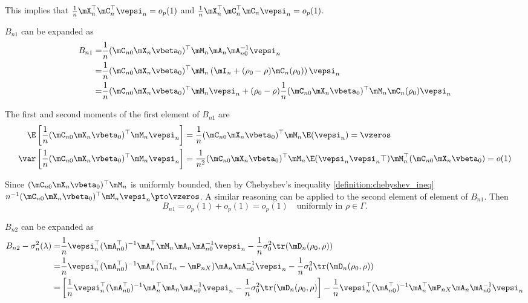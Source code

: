 \documentclass[english,12pt]{book}\usepackage[]{graphicx}\usepackage[]{xcolor}
\begin{document}
\begin{subappendices}
This implies that $\frac{1}{n}\mX_n^\top\mC_n^\top\vepsi_n  =o_p(1)$ and $\frac{1}{n}\mX_n^\top\mC_n^\top\mC_n\vepsi_n = o_p(1)$.

$B_{n1}$ can be expanded as
\begin{equation*}
\begin{aligned}
B_{n1}  = &  \frac{1}{n}(\mC_{n0}\mX_n\vbeta_0)^\top\mM_n\mA_n\mA_{n0}^{-1}\vepsi_n \\
        = & \frac{1}{n}(\mC_{n0}\mX_n\vbeta_0)^\top\mM_n\left(\mI_n + (\rho_0 - \rho)\mC_n (\rho_0)\right)\vepsi_n \\
        = & \frac{1}{n}(\mC_{n0}\mX_n\vbeta_0)^\top\mM_n\vepsi_n + (\rho_0 - \rho)\frac{1}{n}(\mC_{n0}\mX_n\vbeta_0)^\top\mM_n\mC_n(\rho_0)\vepsi_n 
\end{aligned} 
\end{equation*}

The first and second moments of the first element of $B_{n1}$ are
\begin{equation*}
\begin{aligned}
\E\left[\frac{1}{n}(\mC_{n0}\mX_n\vbeta_0)^\top\mM_n\vepsi_n\right] & = \frac{1}{n}(\mC_{n0}\mX_n\vbeta_0)^\top\mM_n\E(\vepsi_n) = \vzeros \\
\var\left[\frac{1}{n}(\mC_{n0}\mX_n\vbeta_0)^\top\mM_n\vepsi_n\right] & = \frac{1}{n^2}(\mC_{n0}\mX_n\vbeta_0)^\top\mM_n\E(\vepsi_n\vepsi_n\top)\mM_n^\top(\mC_{n0}\mX_n\vbeta_0) = o(1)
\end{aligned}
\end{equation*}

Since $(\mC_{n0}\mX_n\vbeta_0)^\top\mM_n$ is uniformly bounded, then by Chebyshev's inequality \ref{definition:chebyshev_ineq} $n^{-1}(\mC_{n0}\mX_n\vbeta_0)^\top\mM_n\vepsi_n\pto \vzeros$. A similar reasoning can be applied to the second element of element of $B_{n1}$. Then
\begin{equation*}
  B_{n1} =  o_p(1) + o_p(1) = o_p(1)\quad \mbox{uniformly in $\rho \in \Gamma$.}
\end{equation*}

$B_{n2}$ can be expanded as
\begin{equation*}
\begin{aligned}
B_{n2} - \sigma^2_n(\lambda) = & \frac{1}{n}\vepsi_n^\top(\mA_{n0}^\top)^{-1}\mA_n^\top\mM_n\mA_n\mA_{n0}^{-1}\vepsi_n -  \frac{1}{n}\sigma_0^2\tr(\mD_n(\rho_0, \rho))\\
= & \frac{1}{n}\vepsi_n^\top(\mA_{n0}^\top)^{-1}\mA_n^\top(\mI_n - \mP_{nX})\mA_n\mA_{n0}^{-1}\vepsi_n -  \frac{1}{n}\sigma_0^2\tr(\mD_n(\rho_0, \rho)) \\
= & \left[\frac{1}{n}\vepsi_n^\top(\mA_{n0}^\top)^{-1}\mA_n^\top\mA_n\mA_{n0}^{-1}\vepsi_n -   \frac{1}{n}\sigma_0^2\tr(\mD_n(\rho_0, \rho)\right] - \frac{1}{n}\vepsi_n^\top(\mA_{n0}^\top)^{-1}\mA_n^\top\mP_{nX}\mA_n\mA_{n0}^{-1}\vepsi_n 
\end{aligned}
\end{equation*}


\end{subappendices}
\end{document}
